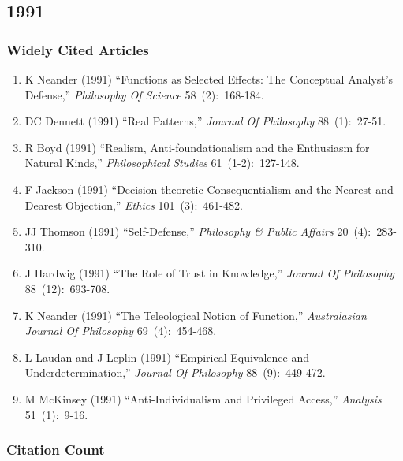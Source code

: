 \documentclass[
  10pt,
  letterpaper,
  DIV=11,
  numbers=noendperiod,
  twoside]{scrartcl}
\providecommand{\tightlist}{%
  \setlength{\itemsep}{0pt}\setlength{\parskip}{0pt}}\usepackage{longtable,booktabs,array}
\begin{document}
\newpage

\subsection{1991}\label{sec-s1991}

\subsubsection*{Widely Cited Articles}\label{widely-cited-articles-35}

\begin{enumerate}
\def\labelenumi{\arabic{enumi}.}
\tightlist
\item
  K Neander (1991) ``Functions as Selected Effects: The Conceptual
  Analyst's Defense,'' \emph{Philosophy Of Science} 58~(2):~168-184.
\item
  DC Dennett (1991) ``Real Patterns,'' \emph{Journal Of Philosophy}
  88~(1):~27-51.
\item
  R Boyd (1991) ``Realism, Anti-foundationalism and the Enthusiasm for
  Natural Kinds,'' \emph{Philosophical Studies} 61~(1-2):~127-148.
\item
  F Jackson (1991) ``Decision-theoretic Consequentialism and the Nearest
  and Dearest Objection,'' \emph{Ethics} 101~(3):~461-482.
\item
  JJ Thomson (1991) ``Self-Defense,'' \emph{Philosophy \& Public
  Affairs} 20~(4):~283-310.
\item
  J Hardwig (1991) ``The Role of Trust in Knowledge,'' \emph{Journal Of
  Philosophy} 88~(12):~693-708.
\item
  K Neander (1991) ``The Teleological Notion of Function,''
  \emph{Australasian Journal Of Philosophy} 69~(4):~454-468.
\item
  L Laudan and J Leplin (1991) ``Empirical Equivalence and
  Underdetermination,'' \emph{Journal Of Philosophy} 88~(9):~449-472.
\item
  M McKinsey (1991) ``Anti-Individualism and Privileged Access,''
  \emph{Analysis} 51~(1):~9-16.
\end{enumerate}

\subsubsection*{Citation Count}\label{sec-count-1991}
\end{document}
